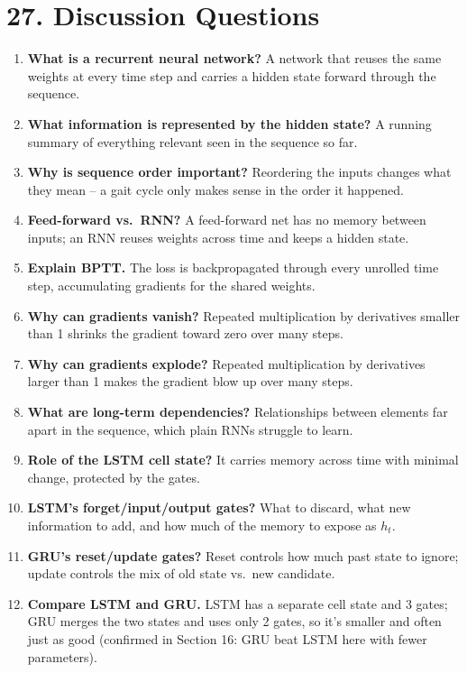 \documentclass[10pt]{article}
\begin{document}
\section*{27. Discussion Questions}

\begin{enumerate}
\item \textbf{What is a recurrent neural network?} A network that reuses the same weights at every time step and carries a hidden state forward through the sequence.
\item \textbf{What information is represented by the hidden state?} A running summary of everything relevant seen in the sequence so far.
\item \textbf{Why is sequence order important?} Reordering the inputs changes what they mean -- a gait cycle only makes sense in the order it happened.
\item \textbf{Feed-forward vs.\ RNN?} A feed-forward net has no memory between inputs; an RNN reuses weights across time and keeps a hidden state.
\item \textbf{Explain BPTT.} The loss is backpropagated through every unrolled time step, accumulating gradients for the shared weights.
\item \textbf{Why can gradients vanish?} Repeated multiplication by derivatives smaller than 1 shrinks the gradient toward zero over many steps.
\item \textbf{Why can gradients explode?} Repeated multiplication by derivatives larger than 1 makes the gradient blow up over many steps.
\item \textbf{What are long-term dependencies?} Relationships between elements far apart in the sequence, which plain RNNs struggle to learn.
\item \textbf{Role of the LSTM cell state?} It carries memory across time with minimal change, protected by the gates.
\item \textbf{LSTM's forget/input/output gates?} What to discard, what new information to add, and how much of the memory to expose as $h_t$.
\item \textbf{GRU's reset/update gates?} Reset controls how much past state to ignore; update controls the mix of old state vs.\ new candidate.
\item \textbf{Compare LSTM and GRU.} LSTM has a separate cell state and 3 gates; GRU merges the two states and uses only 2 gates, so it's smaller and often just as good (confirmed in Section 16: GRU beat LSTM here with fewer parameters).

\end{enumerate}
\end{document}
